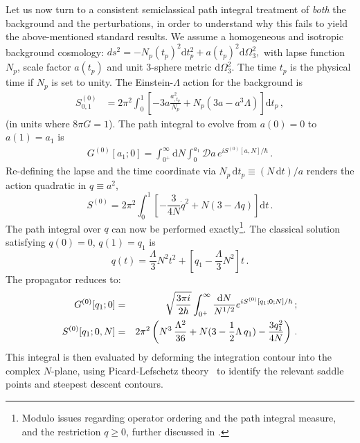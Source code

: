 \documentclass[twocolumn,amsmath,amssymb,superscriptaddress,nofootinbib]{revtex4-1}
\begin{document}
Let us now turn to a consistent semiclassical path integral treatment of {\it both} the background and the perturbations, in order to understand why this fails to yield the above-mentioned standard results. We assume a homogeneous and isotropic background cosmology: $ds^2= - N_p(t_p)^2 \mathrm{d}t_p^2 + a(t_p)^2 \mathrm{d}\Omega_3^2, $ with lapse function $N_p$, scale factor $a(t_p)$ and unit $3$-sphere metric $\mathrm{d}\Omega_3^2$. The time $t_p$ is the physical time if $N_p$ is set to unity. The Einstein-$\Lambda$ action for the background is 
\begin{align}
S^{(0)}_{0,1} 
&= 2 \pi ^2 \int_0^1  \left[ - 3 a \frac{ a_{,t_p} ^2 }{N_p} + N_p( 3a - a ^3 \Lambda )\right]\mathrm{d}t_p \label{eq:Action}\,,\nonumber
\end{align} 
(in units where $8\pi G = 1$). The path integral to evolve from $a(0)=0$ to $a(1)=a_1$ is \cite{Teitelboim:1982,Halliwell:1988wc}
\begin{align}
G^{(0)}[a_1;0] = \int_{0^+}^\infty \mathrm{d}N \int_0^{a_1}\mathcal{D}a\, e^{i S^{(0)}[a,N]/\hbar}\,.\nonumber
\end{align} 
Re-defining the lapse and the time coordinate via $N_p \,\mathrm{d}t_p \equiv (N\,\mathrm{d}t)/a$ renders the action quadratic in $q\equiv a^2$,
\begin{equation}
S^{(0)}= 2 \pi ^2 \int_0^1 \left[ -\frac{3}{4 N}\dot{q}^2 + N(3 -  \Lambda q) \right]\mathrm{d}t \,. \label{ActionH}
\end{equation} 
The path integral over $q$ can now be performed exactly\footnote{Modulo issues regarding operator ordering and the path integral measure, and the restriction $q\geq 0$, further discussed in  \cite{Feldbrugge:2017kzv, Gielen2}.}. The classical solution satisfying $q(0)=0$, $q(1)=q_1$ is
\begin{equation}
q(t) =\frac{\Lambda}{3} N^2 t^2 + \left[q_1 - \frac{\Lambda}{3}N^2 \right] t\, .\nonumber
\label{qsol}
\end{equation}
The propagator reduces to:
\begin{eqnarray}
G^{(0)}[q_1;0] &=& \sqrt{\frac{3\pi i}{2\hbar}}\int_{0^+}^\infty \frac{\mathrm{d} N}{N^{1/2}} e^{i S^{(0)}[q_1;0;N]/\hbar} \label{eq:Nintegral}\,; \nonumber \cr
S^{(0)}[q_1;0,N]&=&2 \pi^2\left(N^3 \, \frac{\Lambda^2}{36} + N (3 -{1\over 2} \Lambda\, q_1) -\frac{3 q_1^2}{4N}\right) \,.\nonumber
\end{eqnarray}
This integral is then evaluated by deforming the integration contour into the complex $N$-plane, using Picard-Lefschetz theory~\cite{Arnold:singularities,Witten:2010cx} to identify the relevant saddle points and steepest descent contours. 
\end{document}
